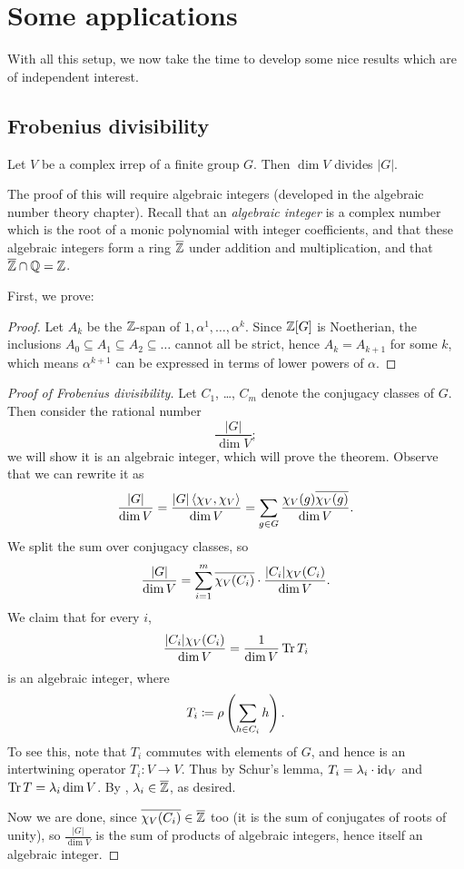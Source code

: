 \chapter{Some applications}
With all this setup, we now take the time to develop some nice
results which are of independent interest.

\section{Frobenius divisibility}
\begin{theorem}
	Let $V$ be a complex irrep of a finite group $G$.
	Then $\dim V$ divides $|G|$.
\end{theorem}
The proof of this will require algebraic integers
(developed in the algebraic number theory chapter).
Recall that an \emph{algebraic integer} is a complex number
which is the root of a monic polynomial with integer coefficients,
and that these algebraic integers form a ring $\overline{\mathbb Z}$
under addition and multiplication, and that $\overline{\mathbb Z} \cap \mathbb Q = \mathbb Z$.

First, we prove:
\newcommand{\tempuuujbhtkx}{$\ZZ[G]$}
\begin{proof}
	Let $A_k$ be the $\mathbb Z$-span of $1, \alpha^1, \dots, \alpha^k$.
	Since $\mathbb Z[G]$ is Noetherian,
	the inclusions $A_0 \subseteq A_1 \subseteq A_2 \subseteq \dots$
	cannot all be strict, hence $A_k = A_{k+1}$ for some $k$,
	which means $\alpha^{k+1}$ can be expressed in terms of
	lower powers of $\alpha$.
\end{proof}

\begin{proof}
	[Proof of Frobenius divisibility]
	Let $C_1$, \dots, $C_m$ denote the conjugacy classes of $G$.
	Then consider the rational number \[ \frac{|G|}{\dim V}; \]
	we will show it is an algebraic integer, which will prove the theorem.
	Observe that we can rewrite it as
	\[
		\frac{|G|}{\dim V}
		= \frac{|G| \left< \chi_V, \chi_V \right>}{\dim V}
		= \sum_{g \in G} \frac{\chi_V(g) \overline{\chi_V(g)}}{\dim V}.
	\]
	We split the sum over conjugacy classes, so
	\[
		\frac{|G|}{\dim V}
		=
		\sum_{i=1}^m \overline{\chi_V(C_i)} \cdot \frac{|C_i| \chi_V(C_i)}{\dim V}.
	\]
	We claim that for every $i$,
	\[ \frac{|C_i| \chi_V(C_i)}{\dim V}
		= \frac{1}{\dim V} \operatorname{Tr} T_i \]
	is an algebraic integer,
	where \[ T_i \coloneqq \rho\left(\sum_{h \in C_i} h\right). \]
	To see this, note that $T_i$ commutes with elements of $G$,
	and hence is an intertwining operator $T_i \colon V \to V$.
	Thus by Schur's lemma, $T_i = \lambda_i \cdot \mathrm{id}_V$
	and $\operatorname{Tr} T = \lambda_i \dim V$.
	By , $\lambda_i \in \overline{\mathbb Z}$, as desired.

	Now we are done, since $ \in \ol\ZZ$ too
	(it is the sum of conjugates of roots of unity),
	so $$ is the sum of products of algebraic integers,
	hence itself an algebraic integer.
\end{proof}

